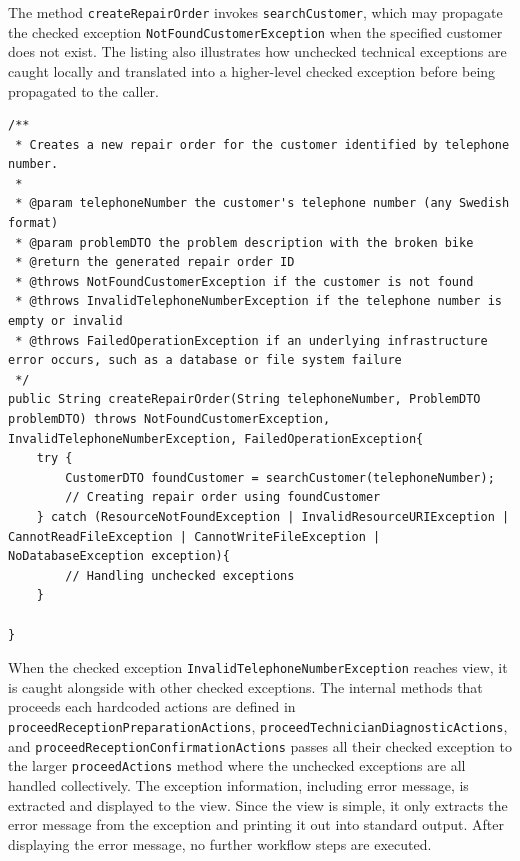 \documentclass[a4paper]{scrartcl}
\begin{document}
The method \texttt{createRepairOrder} invokes \texttt{searchCustomer}, which may propagate the checked exception \texttt{NotFoundCustomerException} when the specified customer does not exist. The listing also illustrates how unchecked technical exceptions are caught locally and translated into a higher-level checked exception before being propagated to the caller.

\begin{lstlisting}[style=javastyle, caption={searchCustomer and createRepairOrder methods in createRepairOrder class propagating exceptions}]
/**
 * Creates a new repair order for the customer identified by telephone number.
 *
 * @param telephoneNumber the customer's telephone number (any Swedish format)
 * @param problemDTO the problem description with the broken bike
 * @return the generated repair order ID
 * @throws NotFoundCustomerException if the customer is not found
 * @throws InvalidTelephoneNumberException if the telephone number is empty or invalid
 * @throws FailedOperationException if an underlying infrastructure error occurs, such as a database or file system failure
 */
public String createRepairOrder(String telephoneNumber, ProblemDTO problemDTO) throws NotFoundCustomerException, InvalidTelephoneNumberException, FailedOperationException{
    try {
        CustomerDTO foundCustomer = searchCustomer(telephoneNumber);
        // Creating repair order using foundCustomer
    } catch (ResourceNotFoundException | InvalidResourceURIException | CannotReadFileException | CannotWriteFileException | NoDatabaseException exception){
        // Handling unchecked exceptions
    }
    
}
\end{lstlisting}

When the checked exception \texttt{InvalidTelephoneNumberException} reaches view, it is caught alongside with other checked exceptions. The internal methods that proceeds each hardcoded actions are defined in \texttt{proceedReceptionPreparationActions}, \texttt{proceedTechnicianDiagnosticActions}, and \texttt{proceedReceptionConfirmationActions} passes all their checked exception to the larger \texttt{proceedActions} method where the unchecked exceptions are all handled collectively. The exception information, including error message, is extracted and displayed to the view. Since the view is simple, it only extracts the error message from the exception and printing it out into standard output. After displaying the error message, no further workflow steps are executed. 
\end{document}
